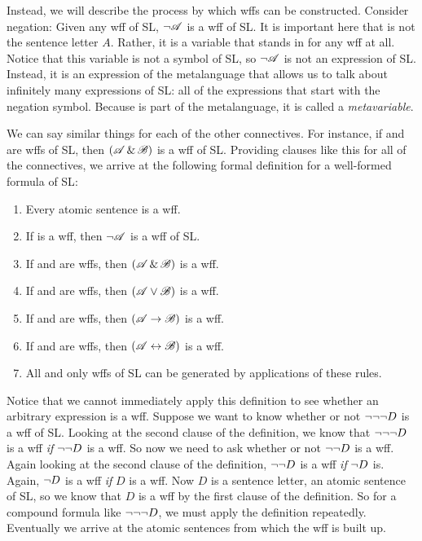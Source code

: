 Instead, we will describe the process by which wffs can be constructed. Consider negation: Given any wff  of SL, $\neg\mathscr{A}$ is a wff of SL. It is important here that  is not the sentence letter $A$. Rather, it is a variable that stands in for any wff at all. Notice that this variable  is not a symbol of SL, so $\neg\mathscr{A}$ is not an expression of SL. Instead, it is an expression of the metalanguage that allows us to talk about infinitely many expressions of SL: all of the expressions that start with the negation symbol. Because  is part of the metalanguage, it is called a \emph{metavariable}.


We can say similar things for each of the other connectives. For instance, if  and  are wffs of SL, then $(\mathscr{A}\,\&\,\mathscr{B})$ is a wff of SL. Providing clauses like this for all of the connectives, we arrive at the following formal definition for a {well-formed formula of SL}:

\begin{enumerate}
\item Every atomic sentence is a wff.
\item If  is a wff, then $\neg\mathscr{A}$ is a wff of SL.
\item If  and  are wffs, then $(\mathscr{A}\,\&\,\mathscr{B})$ is a wff.
\item If  and  are wffs, then $(\mathscr{A}\vee\mathscr{B})$ is a wff.
\item If  and  are wffs, then $(\mathscr{A}\rightarrow\mathscr{B})$ is a wff.
\item If  and  are wffs, then $(\mathscr{A}\leftrightarrow\mathscr{B})$ is a wff.
\item All and only wffs of SL can be generated by applications of these rules.
\end{enumerate}


Notice that we cannot immediately apply this definition to see whether an arbitrary expression is a wff. Suppose we want to know whether or not $\neg \neg \neg D$ is a wff of SL. Looking at the second clause of the definition, we know that $\neg \neg \neg D$ is a wff \emph{if} $\neg \neg D$ is a wff. So now we need to ask whether or not $\neg \neg D$ is a wff. Again looking at the second clause of the definition, $\neg \neg D$ is a wff \emph{if} $\neg D$ is. Again, $\neg D$ is a wff \emph{if} $D$ is a wff. Now $D$ is a sentence letter, an atomic sentence of SL, so we know that $D$ is a wff by the first clause of the definition. So for a compound formula like $\neg \neg \neg D$, we must apply the definition repeatedly. Eventually we arrive at the atomic sentences from which the wff is built up.

